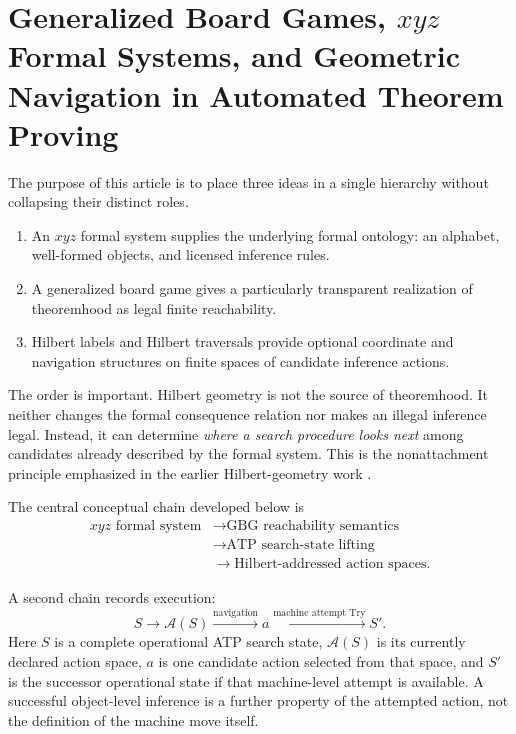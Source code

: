 \documentclass[11pt]{article}
\theoremstyle{definition}
\newcommand{\Try}{\operatorname{Try}}
\begin{document}
\tableofcontents

\section{Generalized Board Games, \texorpdfstring{$xyz$}{xyz} Formal Systems, and Geometric Navigation in Automated Theorem Proving}

The purpose of this article is to place three ideas in a single hierarchy without collapsing their distinct roles.

\begin{enumerate}[label=\textbf{\arabic*.},leftmargin=2em]
\item An $xyz$ formal system supplies the underlying formal ontology: an alphabet, well-formed objects, and licensed inference rules.
\item A generalized board game gives a particularly transparent realization of theoremhood as legal finite reachability.
\item Hilbert labels and Hilbert traversals provide optional coordinate and navigation structures on finite spaces of candidate inference actions.
\end{enumerate}

The order is important. Hilbert geometry is not the source of theoremhood. It neither changes the formal consequence relation nor makes an illegal inference legal. Instead, it can determine \emph{where a search procedure looks next} among candidates already described by the formal system. This is the nonattachment principle emphasized in the earlier Hilbert-geometry work \cite{TennesonHilbertPartI,TennesonHilbertSearch}.

The central conceptual chain developed below is
\[
\boxed{\begin{aligned}
\text{$xyz$ formal system}
&\longrightarrow \text{GBG reachability semantics}\\
&\longrightarrow \text{ATP search-state lifting}\\
&\longrightarrow \text{Hilbert-addressed action spaces}.
\end{aligned}}
\]

A second chain records execution:
\[
\boxed{
S
\longrightarrow
\mathcal A(S)
\xrightarrow{\text{navigation}}
a
\xrightarrow{\text{machine attempt }\Try}
S'.
}
\]
Here $S$ is a complete operational ATP search state, $\mathcal A(S)$ is its currently declared action space, $a$ is one candidate action selected from that space, and $S'$ is the successor operational state if that machine-level attempt is available. A successful object-level inference is a further property of the attempted action, not the definition of the machine move itself.
\end{document}
